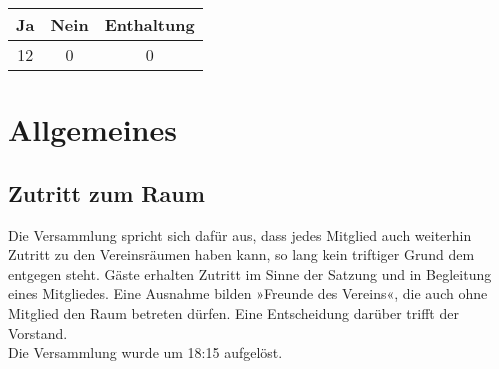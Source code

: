 \documentclass{scrartcl}
\begin{document}
\begin{table}[h!]
    \centering
    \begin{tabular}{c|c|c}
        \textbf{Ja} & \textbf{Nein} & \textbf{Enthaltung} \\ \hline
        12 & 0 & 0
    \end{tabular}
\end{table}

\section{Allgemeines}

\subsection{Zutritt zum Raum}
Die Versammlung spricht sich dafür aus, dass jedes Mitglied auch
weiterhin Zutritt zu den Vereinsräumen haben kann, so lang kein
triftiger Grund dem entgegen steht.
Gäste erhalten Zutritt im Sinne der Satzung und in Begleitung eines
Mitgliedes.
Eine Ausnahme bilden »Freunde des Vereins«, die auch ohne Mitglied den
Raum betreten dürfen.
Eine Entscheidung darüber trifft der Vorstand. \\[1ex]
Die Versammlung wurde um 18:15 aufgelöst.
\end{document}
